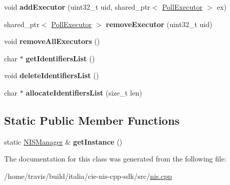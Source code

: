 \begin{DoxyCompactItemize}
\item 
\hypertarget{classNISManager_a40aeca3b6e971ecb75495e2eae06c967}{void {\bfseries add\-Executor} (uint32\-\_\-t uid, shared\-\_\-ptr$<$ \hyperlink{structPollExecutor}{Poll\-Executor} $>$ ex)}\label{classNISManager_a40aeca3b6e971ecb75495e2eae06c967}

\item 
\hypertarget{classNISManager_a1334f6c8113f006d34ac12c10a71d169}{shared\-\_\-ptr$<$ \hyperlink{structPollExecutor}{Poll\-Executor} $>$ {\bfseries remove\-Executor} (uint32\-\_\-t uid)}\label{classNISManager_a1334f6c8113f006d34ac12c10a71d169}

\item 
\hypertarget{classNISManager_a19037ce4d2614109b7086abdab6fad95}{void {\bfseries remove\-All\-Executors} ()}\label{classNISManager_a19037ce4d2614109b7086abdab6fad95}

\item 
\hypertarget{classNISManager_a713e9399922ebfdb0b5bbe5fee8f1bc3}{char $\ast$ {\bfseries get\-Identifiers\-List} ()}\label{classNISManager_a713e9399922ebfdb0b5bbe5fee8f1bc3}

\item 
\hypertarget{classNISManager_a56879726595d8357c09ecafe5cb074e3}{void {\bfseries delete\-Identifiers\-List} ()}\label{classNISManager_a56879726595d8357c09ecafe5cb074e3}

\item 
\hypertarget{classNISManager_ab55cd1e722e46885664f52eb883e2ead}{char $\ast$ {\bfseries allocate\-Identifiers\-List} (size\-\_\-t len)}\label{classNISManager_ab55cd1e722e46885664f52eb883e2ead}

\end{DoxyCompactItemize}
\subsection*{Static Public Member Functions}
\begin{DoxyCompactItemize}
\item 
\hypertarget{classNISManager_af6a7f2cb644fe38ef43b2ed9323506c7}{static \hyperlink{classNISManager}{N\-I\-S\-Manager} \& {\bfseries get\-Instance} ()}\label{classNISManager_af6a7f2cb644fe38ef43b2ed9323506c7}

\end{DoxyCompactItemize}


The documentation for this class was generated from the following file\-:\begin{DoxyCompactItemize}
\item 
/home/travis/build/italia/cie-\/nis-\/cpp-\/sdk/src/\hyperlink{nis_8cpp}{nis.\-cpp}\end{DoxyCompactItemize}
